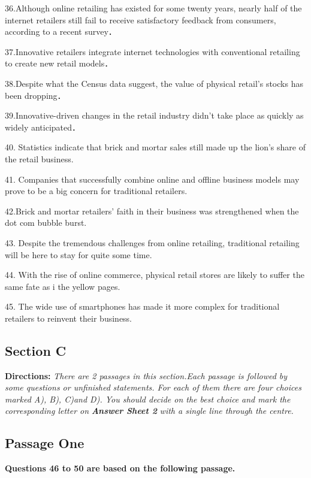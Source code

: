 \documentclass[UTF8,11pt]{ctexart}
\begin{document}
36.Although online retailing has existed for some twenty years, nearly half of the internet retailers still fail to receive satisfactory feedback from consumers, according to a recent survey．


37.Innovative retailers integrate internet technologies with conventional retailing to create new retail models．


38.Despite what the Census data suggest, the value of physical retail’s stocks has been dropping．


39.Innovative-driven changes in the retail industry didn’t take place as quickly as widely anticipated．


40. Statistics indicate that brick and mortar sales still made up the lion’s share of the retail business.


41. Companies that successfully combine online and offline business models may prove to be a big concern for traditional retailers.


42.Brick and mortar retailers’ faith in their business was strengthened when the dot com bubble burst.


43. Despite the tremendous challenges from online retailing, traditional retailing will be here to stay for quite some time.


44. With the rise of online commerce, physical retail stores are likely to suffer the same fate as i the yellow pages.


45. The wide use of smartphones has made it more complex for traditional retailers to reinvent their business.


\subsection*{\textbf{Section C}}


\textbf{Directions:}\textit{ There are 2 passages in this section.Each passage is followed by some questions or unfinished} \textit{statements. For each of them there are four choices marked A), B), C)and D). You should decide on the best choice} \textit{and mark the corresponding letter on}\textbf{\textit{ Answer Sheet 2}}\textit{ with a single line through the centre.}


\subsection*{\textbf{Passage One}}


\textbf{Questions 46 to 50 are based on the following passage.}
\end{document}
